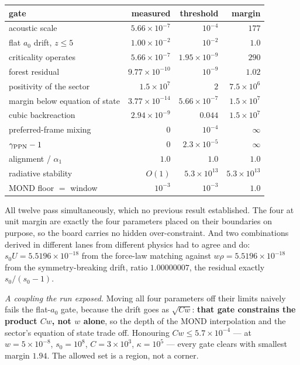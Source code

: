 \documentclass[11pt,letterpaper]{article}
\begin{document}
\begin{center}\small
\begin{tabular}{lrrr}
\toprule
gate & measured & threshold & margin \\
\midrule
acoustic scale & $5.66\times10^{-7}$ & $10^{-4}$ & $177$ \\
flat $a_0$ drift, $z\le5$ & $1.00\times10^{-2}$ & $10^{-2}$ & $1.0$ \\
criticality operates & $5.66\times10^{-7}$ & $1.95\times10^{-9}$ & $290$ \\
forest residual & $9.77\times10^{-10}$ & $10^{-9}$ & $1.02$ \\
positivity of the sector & $1.5\times10^{7}$ & $2$ & $7.5\times10^6$ \\
margin below equation of state & $3.77\times10^{-14}$ & $5.66\times10^{-7}$ & $1.5\times10^7$ \\
cubic backreaction & $2.94\times10^{-9}$ & $0.044$ & $1.5\times10^7$ \\
preferred-frame mixing & $0$ & $10^{-4}$ & $\infty$ \\
$\gamma_{\rm PPN}-1$ & $0$ & $2.3\times10^{-5}$ & $\infty$ \\
alignment / $\alpha_1$ & $1.0$ & $1.0$ & $1.0$ \\
radiative stability & $O(1)$ & $5.3\times10^{13}$ & $5.3\times10^{13}$ \\
MOND floor $=$ window & $10^{-3}$ & $10^{-3}$ & $1.0$ \\
\bottomrule
\end{tabular}
\end{center}

All twelve pass simultaneously, which no previous result established. The four at unit margin are exactly the four parameters placed on their boundaries on purpose, so the board carries no hidden over-constraint. And two combinations derived in different lanes from different physics had to agree and do: $s_0U=5.5196\times10^{-18}$ from the force-law matching against $w\rho=5.5196\times10^{-18}$ from the symmetry-breaking drift, ratio $1.00000007$, the residual exactly $s_0/(s_0-1)$.

\emph{A coupling the run exposed.} Moving all four parameters off their limits naively fails the flat-$a_0$ gate, because the drift goes as $\sqrt{Cw}$: \textbf{that gate constrains the product $Cw$, not $w$ alone}, so the depth of the MOND interpolation and the sector's equation of state trade off. Honouring $Cw\le5.7\times10^{-4}$ --- at $w=5\times10^{-8}$, $s_0=10^8$, $C=3\times10^3$, $\kappa=10^5$ --- every gate clears with smallest margin $1.94$. The allowed set is a region, not a corner.
\end{document}
